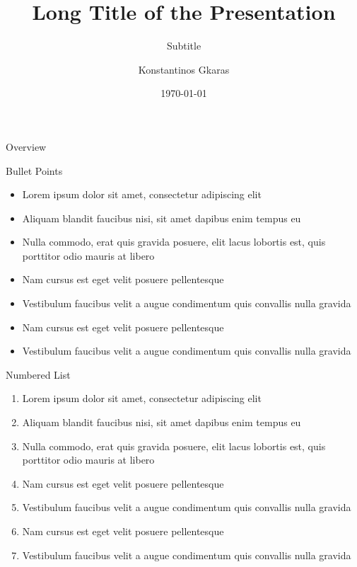 \documentclass[aspectratio=169,xcolor=dvipsnames, t]{beamer}
\title[short title]{Long Title of the Presentation} %
\subtitle{Subtitle}
\author{Konstantinos Gkaras}
\institute[University of Groningen, Faculty Science and Engineering]{Faculty Science and Engineering
\newline
University of Groningen
}
\date{\today} %
\begin{document}
\maketitlepage

\begin{frame}[t]{Overview}
    \tableofcontents
\end{frame}


\begin{frame}{Bullet Points}
    \begin{itemize}
        \item Lorem ipsum dolor sit amet, consectetur adipiscing elit
        \item Aliquam blandit faucibus nisi, sit amet dapibus enim tempus eu
        \item Nulla commodo, erat quis gravida posuere, elit lacus lobortis est, quis porttitor odio mauris at libero
        \item Nam cursus est eget velit posuere pellentesque
        \item Vestibulum faucibus velit a augue condimentum quis convallis nulla gravida
        \item Nam cursus est eget velit posuere pellentesque
        \item Vestibulum faucibus velit a augue condimentum quis convallis nulla gravida
    \end{itemize}
\end{frame}

\begin{frame}{Numbered List}
    \begin{enumerate}
        \item Lorem ipsum dolor sit amet, consectetur adipiscing elit
        \item Aliquam blandit faucibus nisi, sit amet dapibus enim tempus eu
        \item Nulla commodo, erat quis gravida posuere, elit lacus lobortis est, quis porttitor odio mauris at libero
        \item Nam cursus est eget velit posuere pellentesque
        \item Vestibulum faucibus velit a augue condimentum quis convallis nulla gravida
        \item Nam cursus est eget velit posuere pellentesque
        \item Vestibulum faucibus velit a augue condimentum quis convallis nulla gravida
    \end{enumerate}
\end{frame}
\end{document}
